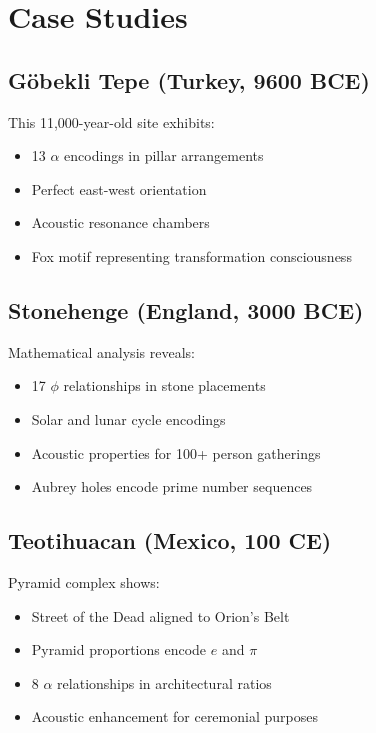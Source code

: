 \documentclass[12pt,a4paper]{article}
\begin{document}
\section{Case Studies}

\subsection{Göbekli Tepe (Turkey, 9600 BCE)}

This 11,000-year-old site exhibits:
\begin{itemize}
    \item 13 $\alpha$ encodings in pillar arrangements
    \item Perfect east-west orientation
    \item Acoustic resonance chambers
    \item Fox motif representing transformation consciousness
\end{itemize}

\subsection{Stonehenge (England, 3000 BCE)}

Mathematical analysis reveals:
\begin{itemize}
    \item 17 $\phi$ relationships in stone placements
    \item Solar and lunar cycle encodings
    \item Acoustic properties for 100+ person gatherings
    \item Aubrey holes encode prime number sequences
\end{itemize}

\subsection{Teotihuacan (Mexico, 100 CE)}

Pyramid complex shows:
\begin{itemize}
    \item Street of the Dead aligned to Orion's Belt
    \item Pyramid proportions encode $e$ and $\pi$
    \item 8 $\alpha$ relationships in architectural ratios
    \item Acoustic enhancement for ceremonial purposes
\end{itemize}
\end{document}

